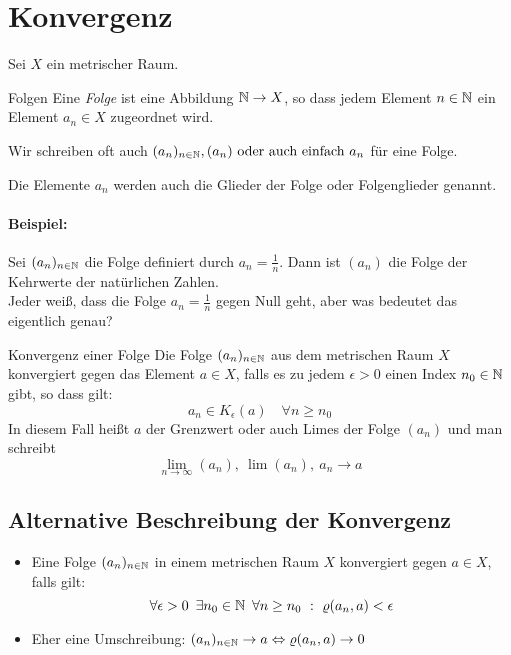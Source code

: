\section{Konvergenz}
Sei $X$ ein metrischer Raum.
\begin{definition}{Folgen}
	Eine \emph{Folge} ist eine Abbildung $\mathbb{N}\rightarrow X$, so dass jedem Element $n\in\mathbb{N}$ ein Element $a_n\in X$ zugeordnet wird.

	Wir schreiben oft auch $(a_n)_{n\in\mathbb{N}}, (a_n) \text{ oder auch einfach } a_n$
	für eine Folge.

	Die Elemente $a_n$ werden auch die Glieder der Folge oder Folgenglieder genannt.
\end{definition}
\paragraph{Beispiel:}
Sei $(a_n)_{n\in\mathbb{N}}$ die Folge definiert durch $a_n=\frac{1}{n}$. Dann ist $(a_n)$ die Folge der Kehrwerte der natürlichen Zahlen.\\
Jeder weiß, dass die Folge $a_n=\frac 1 n$ gegen Null geht, aber was bedeutet das eigentlich genau?

\begin{definition}{Konvergenz einer Folge}
	Die Folge $(a_n)_{n\in\mathbb{N}}$ aus dem metrischen Raum $X$ konvergiert gegen das Element $a\in X$, falls es zu jedem $\epsilon>0$ einen Index $n_0\in\mathbb{N}$ gibt, so dass gilt:
	\begin{equation*}
		a_n\in K_\epsilon(a) \quad\forall n\geq n_0
	\end{equation*}
	In diesem Fall heißt $a$ der Grenzwert oder auch Limes der Folge $(a_n)$ und man schreibt
	\begin{equation*}
		\lim\limits_{n\to\infty}(a_n),\ \lim (a_n),\ a_n\rightarrow a
	\end{equation*}
\end{definition}

\subsection{Alternative Beschreibung der Konvergenz}
\begin{itemize}
	\item Eine Folge $(a_n)_{n\in\mathbb{N}}$ in einem metrischen Raum $X$ konvergiert gegen $a\in X$, falls gilt:
	\begin{equation*}
		\forall\epsilon>0\enspace \exists n_0\in\N\enspace \forall n\geq n_0 \ :\ \varrho(a_n,a)<\epsilon
	\end{equation*}
	\item Eher eine Umschreibung: $(a_n)_{n\in\mathbb{N}} \rightarrow a \Leftrightarrow \varrho(a_n,a)\rightarrow 0$
\end{itemize}

